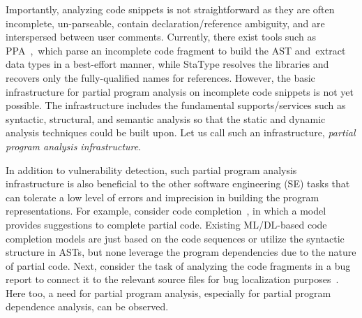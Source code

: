 

Importantly, analyzing code snippets is not straightforward as they
are often incomplete, un-parseable, contain declaration/reference
ambiguity, and are interspersed between user comments. Currently,
there exist tools such as PPA~\cite{ppa08},~which parse an incomplete
code fragment to build the AST and~ex\-tract data types in a
best-effort manner, while StaType \cite{icse18} resolves the libraries
and recovers only the fully-qualified names for references. However,
the basic infrastructure for partial program analysis on incomplete
code snippets is not yet possible. The infrastructure includes the
fundamental supports/services such as syntactic, structural, and
semantic analysis so that the static and dynamic analysis techniques
could be built upon. Let us call such an infrastructure, {\em partial
program analysis infrastructure}.

In addition to vulnerability detection, such partial program analysis
infrastructure is also beneficial to the other software engineering
(SE) tasks that can tolerate a low level of errors and imprecision in
building the program representations. For example, consider code
completion~\cite{codefill-icse22,facebook-icse21}, in which a model
provides suggestions to complete partial code. Existing ML/DL-based
code completion models are just based on the code sequences or utilize
the syntactic structure in ASTs, but none leverage the program
dependencies due to the nature of partial code. Next, consider the
task of analyzing the code fragments in a bug report to connect it to
the relevant source files for bug localization
purposes~\cite{euler-fse19,icpc17}. Here too, a need for partial
program analysis, especially for partial program dependence analysis,
can be observed.








